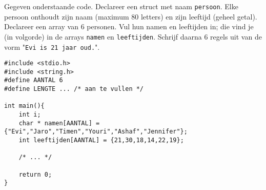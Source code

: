 \beginoef
%
Gegeven onderstaande code. 
Declareer een struct met naam \verb}persoon}. Elke persoon onthoudt zijn naam (maximum 80 letters) en zijn leeftijd (geheel getal).
Declareer een array van 6 personen. Vul hun namen en leeftijden in; die vind je (in volgorde) in de arrays \verb}namen} en
\verb}leeftijden}. Schrijf daarna 6 regels uit van de vorm "\verb}Evi is 21 jaar oud.}".
\begin{footnotesize}
\begin{verbatim}
#include <stdio.h>
#include <string.h>
#define AANTAL 6
#define LENGTE ... /* aan te vullen */

int main(){
    int i;
    char * namen[AANTAL] = {"Evi","Jaro","Timen","Youri","Ashaf","Jennifer"};
    int leeftijden[AANTAL] = {21,30,18,14,22,19};

    /* ... */	

    return 0;
}
\end{verbatim}
\end{footnotesize}
\endoef

